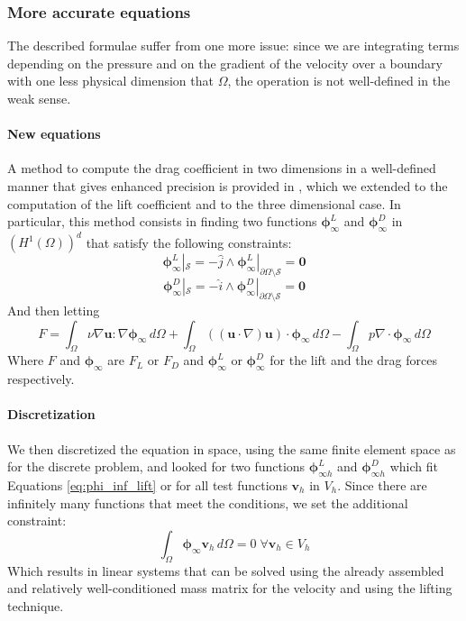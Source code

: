 \subsubsection{More accurate equations}
The described formulae suffer from one more issue: since we are integrating terms depending on the pressure and on the gradient of the velocity over a boundary with one less physical dimension that $\Omega$, the operation is not well-defined in the weak sense.

\paragraph{New equations}
A method to compute the drag coefficient in two dimensions in a well-defined manner that gives enhanced precision is provided in \cite{Dede}, which we extended to the computation of the lift coefficient and to the three dimensional case. In particular, this method consists in finding two functions $\mathbf{\phi}_\infty^L$ and $\mathbf{\phi}_\infty^D$ in $(H^1(\Omega))^d$ that satisfy the following constraints:
\begin{equation}\label{eq:phi_inf_lift}
    \mathbf{\phi}_\infty^L|_{\mathcal{S}} = -\hat{j} \land \mathbf{\phi}_\infty^L|_{\partial\Omega \setminus \mathcal{S}} = \mathbf{0}
\end{equation}
\begin{equation}\label{eq:phi_inf_drag}
    \mathbf{\phi}_\infty^D|_{\mathcal{S}} = -\hat{i} \land \mathbf{\phi}_\infty^D|_{\partial\Omega \setminus \mathcal{S}} = \mathbf{0}
\end{equation}
And then letting 
\begin{equation}\label{eq:force_weak}
    F = \int_{\Omega} \nu \nabla \mathbf{u} : \nabla \mathbf{\mathbf{\phi}_\infty} \, d\Omega + \int_{\Omega} ((\mathbf{u} \cdot \nabla) \mathbf{u}) \cdot \mathbf{\phi}_\infty \, d\Omega - \int_{\Omega} p \nabla \cdot \mathbf{\phi}_\infty \, d\Omega
\end{equation}
Where $F$ and $\mathbf{\phi}_\infty$ are $F_L$ or $F_D$ and $\mathbf{\phi}_\infty^L$ or $\mathbf{\phi}_\infty^D$ for the lift and the drag forces respectively. 

\paragraph{Discretization}
We then discretized the equation in space, using the same finite element space as for the discrete problem, and looked for two functions $\mathbf{\phi}_{\infty h}^L$ and $\mathbf{\phi}_{\infty h}^D$ which fit Equations \ref{eq:phi_inf_lift} or \label{phi_inf_drag} for all test functions $\mathbf{v}_h$ in $V_h$. Since there are infinitely many functions that meet the conditions, we set the additional constraint:
\begin{equation}
    \int_\Omega \mathbf{\phi}_\infty \mathbf{v}_h \, d\Omega = 0 \; \forall \mathbf{v}_h \in V_h
\end{equation}
Which results in linear systems that can be solved using the already assembled and relatively well-conditioned mass matrix for the velocity and using the lifting technique.

